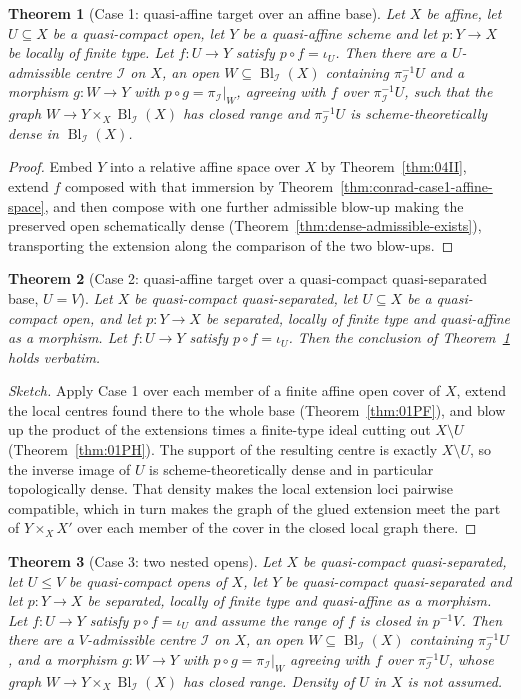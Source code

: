 \documentclass[11pt,a4paper]{article}
\theoremstyle{plain}
\newtheorem{theorem}{Theorem}[section]
\theoremstyle{definition}
\theoremstyle{remark}
\newcommand{\Bl}{\operatorname{Bl}}
\newcommand{\sI}{\mathcal{I}}
\newcommand{\qcqs}{quasi-compact quasi-separated}
\begin{document}
\begin{theorem}[Case 1: quasi-affine target over an affine base]
\label{thm:conrad-case1}
Let $X$ be affine, let $U\subseteq X$ be a quasi-compact open, let $Y$ be a
quasi-affine scheme and let $p\colon Y\to X$ be locally of finite type. Let
$f\colon U\to Y$ satisfy $p\circ f=\iota_U$. Then there are a $U$-admissible
centre $\sI$ on $X$, an open $W\subseteq\Bl_\sI(X)$ containing
$\pi_\sI^{-1}U$ and a morphism $g\colon W\to Y$ with
$p\circ g=\pi_\sI|_W$, agreeing with $f$ over $\pi_\sI^{-1}U$, such that the
graph $W\to Y\times_X\Bl_\sI(X)$ has closed range and $\pi_\sI^{-1}U$ is
scheme-theoretically dense in $\Bl_\sI(X)$.
\end{theorem}

\begin{proof}
Embed $Y$ into a relative affine space over $X$ by Theorem~\ref{thm:04II},
extend $f$ composed with that immersion by
Theorem~\ref{thm:conrad-case1-affine-space}, and then compose with one further
admissible blow-up making the preserved open schematically dense
(Theorem~\ref{thm:dense-admissible-exists}), transporting the extension along
the comparison of the two blow-ups.
\end{proof}

\begin{theorem}[Case 2: quasi-affine target over a \qcqs{} base, $U=V$]
\label{thm:conrad-case2}
Let $X$ be \qcqs{}, let $U\subseteq X$ be a quasi-compact open, and let
$p\colon Y\to X$ be separated, locally of finite type and quasi-affine as a
morphism. Let $f\colon U\to Y$ satisfy $p\circ f=\iota_U$. Then the conclusion
of Theorem~\ref{thm:conrad-case1} holds verbatim.
\end{theorem}

\begin{proof}[Sketch]
Apply Case 1 over each member of a finite affine open cover of $X$, extend the
local centres found there to the whole base (Theorem~\ref{thm:01PF}), and blow
up the product of the extensions times a finite-type ideal cutting out
$X\setminus U$ (Theorem~\ref{thm:01PH}). The support of the resulting centre is
exactly $X\setminus U$, so the inverse image of $U$ is scheme-theoretically
dense and in particular topologically dense. That density makes the local
extension loci pairwise compatible, which in turn makes the graph of the glued
extension meet the part of $Y\times_X X'$ over each member of the cover in the
closed local graph there.
\end{proof}

\begin{theorem}[Case 3: two nested opens]
\label{thm:conrad-case3}
Let $X$ be \qcqs{}, let $U\le V$ be quasi-compact opens of $X$, let $Y$ be
\qcqs{} and let $p\colon Y\to X$ be separated, locally of finite type and
quasi-affine as a morphism. Let $f\colon U\to Y$ satisfy $p\circ f=\iota_U$ and
assume the range of $f$ is closed in $p^{-1}V$. Then there are a
$V$-admissible centre $\sI$ on $X$, an open $W\subseteq\Bl_\sI(X)$ containing
$\pi_\sI^{-1}U$, and a morphism $g\colon W\to Y$ with $p\circ g=\pi_\sI|_W$
agreeing with $f$ over $\pi_\sI^{-1}U$, whose graph
$W\to Y\times_X\Bl_\sI(X)$ has closed range. Density of $U$ in $X$ is not
assumed.
\end{theorem}
\end{document}
